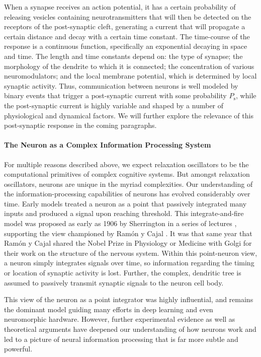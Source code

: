 \documentclass[twocolumn]{article}
\begin{document}
When a synapse receives an action potential, it has a certain probability of releasing vesicles containing neurotransmitters that will then be detected on the receptors of the post-synaptic cleft, generating a current that will propagate a certain distance and decay with a certain time constant. The time-course of the response is a continuous function, specifically an exponential decaying in space and time. The length and time constants depend on: the type of synapse; the morphology of the dendrite to which it is connected; the concentration of various neuromodulators; and the local membrane potential, which is determined by local synaptic activity. Thus, communication between neurons is well modeled by binary events that trigger a post-synaptic current with some probability $P_{\mathrm{s}}$, while the post-synaptic current is highly variable and shaped by a number of physiological and dynamical factors. We will further explore the relevance of this post-synaptic response in the coming paragraphs. 

\paragraph{The Neuron as a Complex Information Processing System}
For multiple reasons described above, we expect relaxation oscillators to be the computational primitives of complex cognitive systems. But amongst relaxation oscillators, neurons are unique in the myriad complexities. Our understanding of the information-processing capabilities of neurons has evolved considerably over time. Early models treated a neuron as a point that passively integrated many inputs and produced a signal upon reaching threshold. This integrate-and-fire model was proposed as early as 1906 by Sherrington in a series of lectures \cite{sh1906}, supporting the view championed by Ram\'{o}n y Cajal \cite{ra1908}. It was that same year that Ram\'{o}n y Cajal shared the Nobel Prize in Physiology or Medicine with Golgi for their work on the structure of the nervous system. Within this point-neuron view, a neuron simply integrates signals over time, so information regarding the timing or location of synaptic activity is lost. Further, the complex, dendritic tree is assumed to passively transmit synaptic signals to the neuron cell body. 

This view of the neuron as a point integrator was highly influential, and remains the dominant model guiding many efforts in deep learning and even neuromorphic hardware. However, further experimental evidence as well as theoretical arguments have deepened our understanding of how neurons work and led to a picture of neural information processing that is far more subtle and powerful. 
\end{document}
